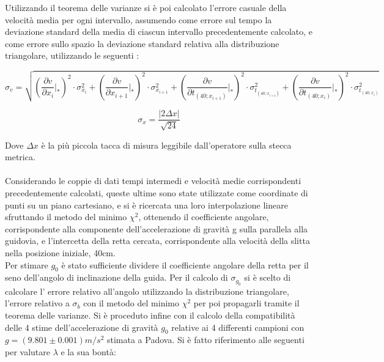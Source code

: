 \documentclass[a4paper,11pt,oneside]{article}
\begin{document}
Utilizzando il teorema delle varianze si è poi calcolato l'errore casuale della velocità media per ogni intervallo, assumendo come errore sul tempo la deviazione standard della media di ciascun intervallo precedentemente calcolato, e come errore sullo spazio la deviazione standard relativa alla distribuzione triangolare, utilizzando le seguenti :

\begin{equation*}\label{eq:propagazione_velocità}
    \sigma_{v}= \sqrt{
   \left( {\frac{\partial v}{\partial x_{i}}} \Big|_{\ast}\right)^{2} \cdot \sigma_{x_{i}}^2  +   
   \left( {\frac{\partial v}{\partial x_{i+1}}}\Big|_{\ast}\right )^{2} \cdot \sigma_{x_{i+1}}^2   +   
   \left( {\frac{\partial v}{\partial t_{\left(40; x_{i+1}\right)}}}\Big|_{\ast}\right)^{2}  \cdot \sigma_{t_{\left(40; x_{i+1}\right)}}^2 +   
       \left( {\frac{\partial v}{\partial t_{\left(40; x_i\right)}}}\Big|_{\ast}\right)^{2} \cdot  \sigma_{t_{\left(40; x_i\right)}}^2
    }
\end{equation*}

\begin{equation*}
\sigma_{x}=\frac{\mathopen|2\Delta x\mathclose|}{\sqrt{24}} 
\end{equation*}
 
Dove $\Delta x$ è la più piccola tacca di misura leggibile dall'operatore sulla stecca metrica.\\
\\

Considerando le coppie di dati tempi intermedi e velocità medie corrispondenti precedentemente calcolati, queste ultime sono state utilizzate come coordinate di punti su un piano cartesiano, e si è ricercata una loro interpolazione lineare sfruttando il metodo del minimo ${\chi}^2$, ottenendo il coefficiente angolare, corrispondente alla componente dell'accelerazione di gravità g sulla parallela  alla guidovia, e l'intercetta della retta cercata, corrispondente alla velocità della slitta nella posizione iniziale, 40cm.\\
Per stimare $g_{0}$ è stato sufficiente dividere il coefficiente angolare della retta per il seno dell'angolo di inclinazione della guida.
Per il calcolo di $ \sigma_{g_{0}}$ si è scelto di calcolare l' errore relativo all'angolo utilizzando la distribuzione triangolare, l'errore relativo a $\sigma_b$ con il metodo del minimo ${\chi}^2$ per poi propagarli tramite il teorema delle varianze. Si è proceduto infine con il calcolo della compatibilità delle 4 stime dell'accelerazione di gravità $g_{0}$ relative ai 4 differenti campioni con $g=(9.801\pm 0.001)\si{m/s^2}$ stimata a Padova. Si è fatto riferimento alle seguenti per valutare  $\lambda$ e la sua bontà:
\end{document}
